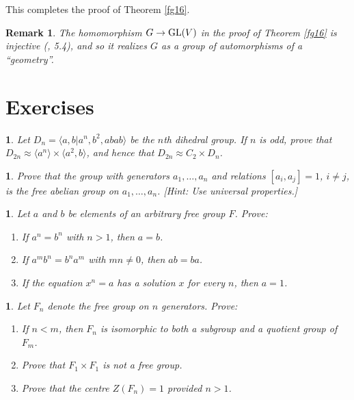 \documentclass[a4paper,11pt,final]{memoir}%
\newtheorem{remark}[X]{Remark}
\newtheorem{exercise}[Y]{}
\theoremstyle{nonumberplain}
\begin{document}
This completes the proof of Theorem \ref{fg16}.

\begin{remark}
\label{fg19}The homomorphism $G\rightarrow\operatorname{GL}(V)$ in the proof of Theorem
\ref{fg16} is injective (\cite{humphreys1990}, 5.4), and so it realizes $G$ as
a group of automorphisms of a \textquotedblleft geometry\textquotedblright.
\end{remark}

\section{Exercises}

\begin{exercise}
\label{x13} Let $D_{n}=\langle a,b|a^{n},b^{2},abab\rangle$ be the $n$th
dihedral group. If $n$ is odd, prove that $D_{2n}\approx\langle a^{n}%
\rangle\times\langle a^{2},b\rangle$, and hence that $D_{2n}\approx
C_{2}\times D_{n}$.
\end{exercise}

\begin{exercise}
\label{x5} Prove that the group with generators $a_{1},\ldots,a_{n}$ and
relations $[a_{i},a_{j}]=1$, $i\neq j$, is the free \textit{abelian\/} group
on $a_{1},\ldots,a_{n}$. [Hint: Use universal properties.]
\end{exercise}

\begin{exercise}
\label{x6} Let $a$ and $b$ be elements of an arbitrary free group $F$. Prove:

\begin{enumerate}
\item If $a^{n}=b^{n}$ with $n>1$, then $a=b$.

\item If $a^{m}b^{n}=b^{n}a^{m}$ with $mn\not =0$, then $ab=ba$.

\item If the equation $x^{n}=a$ has a solution $x$ for every $n$, then $a=1$.
\end{enumerate}
\end{exercise}

\begin{exercise}
\label{x7} Let $F_{n}$ denote the free group on $n$ generators. Prove:

\begin{enumerate}
\item If $n<m$, then $F_{n}$ is isomorphic to both a subgroup and a quotient
group of $F_{m}$.

\item Prove that $F_{1}\times F_{1}$ is not a free group.

\item Prove that the centre $Z(F_{n})=1$ provided $n>1$.
\end{enumerate}
\end{exercise}
\end{document}
